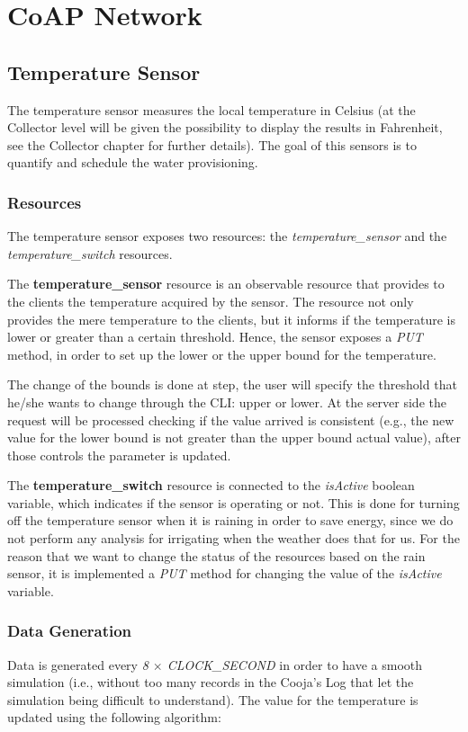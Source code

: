 \section{CoAP Network}


\subsection{Temperature Sensor}
The temperature sensor measures the local temperature in Celsius (at the Collector level will be given the possibility to display the results in Fahrenheit, see the Collector chapter for further details). The goal of this sensors is to quantify and schedule the water provisioning.

\subsubsection{Resources}
The temperature sensor exposes two resources: the \textit{temperature\_sensor} and the \textit{temperature\_switch} resources.

The \textbf{temperature\_sensor} resource is an observable resource that provides to the clients the temperature acquired by the sensor. The resource not only provides the mere temperature to the clients, but it informs if the temperature is lower or greater than a certain threshold. Hence, the sensor exposes a  \textit{PUT} method, in order to set up the lower or the upper bound for the temperature.

The change of the bounds is done at step, the user will specify the threshold that he/she wants to change through the CLI: upper or lower. At the server side the request will be processed checking if the value arrived is consistent (e.g., the new value for the lower bound is not greater than the upper bound actual value), after those controls the parameter is updated.

The \textbf{temperature\_switch} resource is connected to the \textit{isActive} boolean variable, which indicates if the sensor is operating or not. This is done for turning off the temperature sensor when it is raining in order to save energy, since we do not perform any analysis for irrigating when the weather does that for us. For the reason that we want to change the status of the resources based on the rain sensor, it is implemented a \textit{PUT} method for changing the value of the \textit{isActive} variable.

\subsubsection{Data Generation}
Data is generated every \textit{8 $\times$ CLOCK\_SECOND} in order to have a smooth simulation (i.e., without too many records in the Cooja's Log that let the simulation being difficult to understand). The value for the temperature is updated using the following algorithm:

